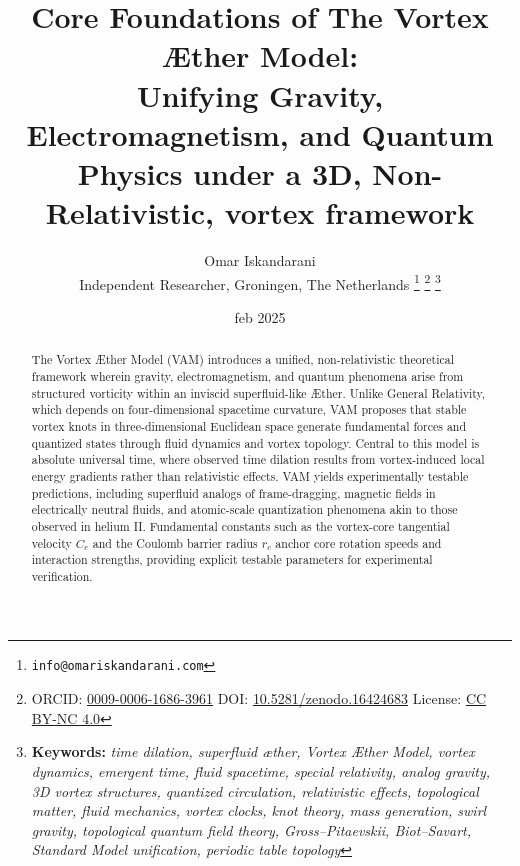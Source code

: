 \documentclass[a4paper,12pt]{article}
\begin{document}
    \title{Core Foundations of The Vortex Æther Model: \\Unifying Gravity, Electromagnetism, and Quantum Physics under a 3D, Non-Relativistic, vortex framework}
    \date{feb 2025}
    \author{
        Omar Iskandarani\\
        \small Independent Researcher, Groningen, The Netherlands
        \thanks{\texttt{info@omariskandarani.com}}
        \thanks{ORCID: \href{https://orcid.org/0009-0006-1686-3961}{0009-0006-1686-3961} \quad DOI: \href{https://doi.org/10.5281/zenodo.16424683}{10.5281/zenodo.16424683} \quad License: \href{https://creativecommons.org/licenses/by/4.0/}{CC BY-NC 4.0}}
        \noindent\thanks{\textbf{Keywords:} \textit{time dilation, superfluid æther, Vortex Æther Model, vortex dynamics, emergent time, fluid spacetime, special relativity, analog gravity, 3D vortex structures, quantized circulation, relativistic effects, topological matter, fluid mechanics, vortex clocks, knot theory, mass generation, swirl gravity, topological quantum field theory, Gross--Pitaevskii, Biot--Savart, Standard Model unification, periodic table topology}}
    }
    \maketitle
    \begin{abstract}
        The Vortex Æther Model (VAM) introduces a unified, non-relativistic theoretical framework wherein gravity, electromagnetism, and quantum phenomena arise from structured vorticity within an inviscid superfluid-like Æther. Unlike General Relativity, which depends on four-dimensional spacetime curvature, VAM proposes that stable vortex knots in three-dimensional Euclidean space generate fundamental forces and quantized states through fluid dynamics and vortex topology. Central to this model is absolute universal time, where observed time dilation results from vortex-induced local energy gradients rather than relativistic effects. VAM yields experimentally testable predictions, including superfluid analogs of frame-dragging, magnetic fields in electrically neutral fluids, and atomic-scale quantization phenomena akin to those observed in helium II. Fundamental constants such as the vortex-core tangential velocity $C_e$ and the Coulomb barrier radius $r_c$ anchor core rotation speeds and interaction strengths, providing explicit testable parameters for experimental verification.
    \end{abstract}
\end{document}
